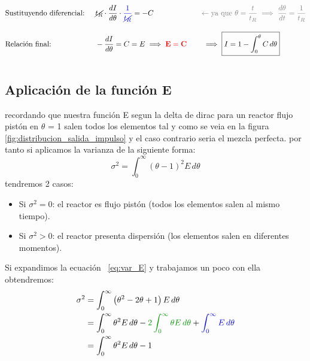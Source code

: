 \begin{alignat*}{3}
     & \text{Sustituyendo diferencial: }        &  & \cancel{t_R} \cdot \frac{dI}{d\theta} \cdot \textcolor{blue}{\frac{1}{\cancel{t_R}}} = -C                                                                                                                                      & \quad & \textcolor{gray}{\leftarrow \text{ya que } \theta = \frac{t}{t_R} \implies \frac{d\theta}{dt} = \frac{1}{t_R}} \\[10pt]
     & \text{Relación final: }                  &  & -\frac{dI}{d\theta} = C = E \implies \mathbf{\color{red} E = C}                                                                                                                                                                & \quad & \implies    \boxed{I = 1 - \int_{0}^{\theta} C \, d\theta}                                                     \\[10pt]
\end{alignat*}
\subsection{Aplicación de la función E}
\noindent recordando que nuestra función E segun la delta de dirac para un reactor flujo pistón en $\theta$ = 1 salen todos los elementos tal y como se veia en la figura \ref{fig:distribucion_salida_impulso} y el caso contrario seria el mezcla perfecta. por tanto si aplicamos la varianza de la siguiente forma:
\begin{equation}
    \sigma^2 = \int_{0}^{\infty} \left( \theta - 1 \right)^2 E \, d\theta \label{eq:var_E}
\end{equation}
\noindent tendremos 2 casos:
\begin{itemize}
    \item Si \(\sigma^2 = 0\): el reactor es flujo pistón (todos los elementos salen al mismo tiempo).
    \item Si \(\sigma^2 > 0\): el reactor presenta dispersión (los elementos salen en diferentes momentos).
\end{itemize}
\noindent Si expandimos la ecuación ~\eqref{eq:var_E} y trabajamos un poco con ella obtendremos:
\begin{align*}
    \sigma^2 & = \int_{0}^{\infty} \left( \theta^2 - 2\theta + 1 \right) E \, d\theta                                                                                        \\
             & = \int_{0}^{\infty} \theta^2 E \, d\theta - \textcolor{darkgreen}{2 \int_{0}^{\infty} \theta E \, d\theta} + \textcolor{blue}{\int_{0}^{\infty} E \, d\theta} \\
             & = \int_{0}^{\infty} \theta^2 E \, d\theta - 1
\end{align*}


